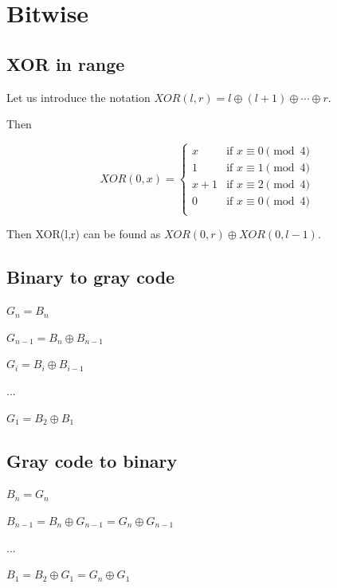 \section{Bitwise}



\subsection{XOR in range}

Let us introduce the notation $XOR(l,r)=l \oplus (l+1) \oplus \cdots \oplus r$.

Then 

\begin{equation}
  XOR(0, x) = 
  \begin{cases}
    x & \text{if } x \equiv 0 \pmod{4} \\
    1 & \text{if } x \equiv 1 \pmod{4} \\
    x + 1 & \text{if } x \equiv 2 \pmod{4} \\
    0 & \text{if } x \equiv 0 \pmod{4} \\
  \end{cases}
\end{equation}


Then XOR(l,r) can be found as $XOR(0,r) \oplus XOR(0,l−1)$.


\subsection{Binary to gray code}

$G_n = B_n$

$G_{n-1} = B_n \oplus B_{n-1} $

$G_{i} = B_i \oplus B_{i-1} $

$ ... $

$ G_1 = B_2 \oplus B_1 $

\subsection{Gray code to binary}


$ B_n = G_n $

$ B_{n-1} = B_n \oplus G_{n-1} = G_n \oplus G_{n-1} $

$ ... $

$ B_1 = B_2 \oplus G_1 = G_n \oplus G_1 $
